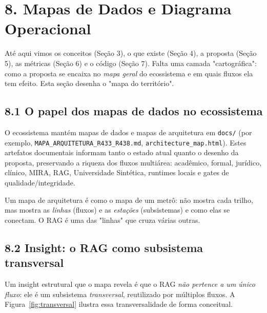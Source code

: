 
\section*{8. Mapas de Dados e Diagrama Operacional}

 Até aqui vimos os conceitos (Seção 3), o que existe (Seção 4), a
proposta (Seção 5), as métricas (Seção 6) e o código (Seção 7). Falta uma camada
"cartográfica": como a proposta se encaixa no \emph{mapa geral} do ecossistema e
em quais fluxos ela tem efeito. Esta seção desenha o "mapa do território".

\subsection*{8.1 O papel dos mapas de dados no ecossistema}

 O ecossistema mantém mapas de dados e mapas de arquitetura em
\texttt{docs/} (por exemplo, \texttt{MAPA\_ARQUITETURA\_R433\_R438.md},
\texttt{architecture\_map.html}). Estes artefatos documentais informam tanto o
estado atual quanto o desenho da proposta, preservando a riqueza dos fluxos
multiárea: acadêmico, formal, jurídico, clínico, MIRA, RAG, Universidade
Sintética, runtimes locais e gates de qualidade/integridade.

\begin{intuicao}
Um mapa de arquitetura é como o mapa de um metrô: não mostra cada trilho, mas
mostra as \emph{linhas} (fluxos) e as \emph{estações} (subsistemas) e como elas
se conectam. O RAG é uma das "linhas" que cruza várias outras.
\end{intuicao}

\subsection*{8.2 Insight: o RAG como subsistema transversal}

 Um insight estrutural que o mapa revela é que o RAG \emph{não pertence a
um único fluxo}: ele é um subsistema \emph{transversal}, reutilizado por múltiplos
fluxos. A Figura~\ref{fig:transversal} ilustra essa transversalidade de forma
conceitual.

